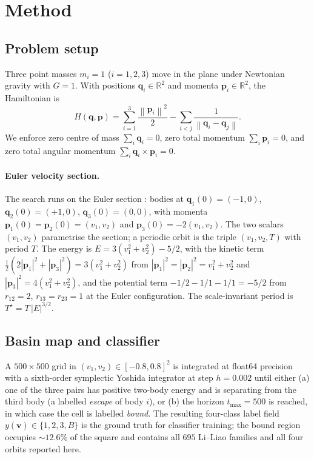 \documentclass[10pt]{article}
\newcommand{\vvec}{\mathbf{v}}
\newcommand{\qvec}{\mathbf{q}}
\newcommand{\pvec}{\mathbf{p}}
\newcommand{\Norm}[1]{\left\lVert#1\right\rVert}
\newcommand{\RR}{\mathbb{R}}
\newcommand{\Tstar}{T^{\star}}
\begin{document}
\section{Method}
\label{sec:method}

\subsection{Problem setup}

Three point masses $m_i = 1$ ($i = 1, 2, 3$) move in the plane under
Newtonian gravity with $G = 1$. With positions $\qvec_i \in \RR^2$ and
momenta $\pvec_i \in \RR^2$, the Hamiltonian is
\begin{equation}
  H(\qvec, \pvec) = \sum_{i=1}^{3} \frac{\Norm{\pvec_i}^2}{2}
  - \sum_{i<j} \frac{1}{\Norm{\qvec_i - \qvec_j}}.
  \label{eq:ham}
\end{equation}
We enforce zero centre of mass $\sum_i \qvec_i = 0$, zero total
momentum $\sum_i \pvec_i = 0$, and zero total angular momentum
$\sum_i \qvec_i \times \pvec_i = 0$.

\paragraph{Euler velocity section.}
The search runs on the Euler section \citep{LiLiao2017}: bodies at
$\qvec_1(0) = (-1, 0)$, $\qvec_2(0) = (+1, 0)$, $\qvec_3(0) = (0, 0)$,
with momenta $\pvec_1(0) = \pvec_2(0) = (v_1, v_2)$ and
$\pvec_3(0) = -2(v_1, v_2)$. The two scalars $(v_1, v_2)$ parametrise
the section; a periodic orbit is the triple $(v_1, v_2, T)$ with
period $T$. The energy is $E = 3(v_1^2 + v_2^2) - 5/2$, with the
kinetic term $\tfrac{1}{2}(2|\pvec_1|^2 + |\pvec_3|^2) = 3(v_1^2+v_2^2)$
from $|\pvec_1|^2 = |\pvec_2|^2 = v_1^2+v_2^2$ and
$|\pvec_3|^2 = 4(v_1^2+v_2^2)$, and the potential term
$-1/2 - 1/1 - 1/1 = -5/2$ from $r_{12}=2$, $r_{13}=r_{23}=1$ at the
Euler configuration. The scale-invariant period is
$\Tstar = T \, |E|^{3/2}$.

\subsection{Basin map and classifier}

A $500\!\times\!500$ grid in $(v_1, v_2) \in [-0.8, 0.8]^2$ is
integrated at float64 precision with a sixth-order symplectic Yoshida
integrator \citep{Yoshida1990} at step $h = 0.002$ until either (a)
one of the three pairs has positive two-body energy and is separating
from the third body (a labelled \emph{escape} of body $i$), or (b) the
horizon $t_{\max} = 500$ is reached, in which case the cell is
labelled \emph{bound}. The resulting four-class label field
$y(\vvec) \in \{1, 2, 3, B\}$ is the ground truth for classifier
training; the bound region occupies $\sim\!12.6\%$ of the square and
contains all $695$ Li--Liao families and all four orbits reported here.
\end{document}
